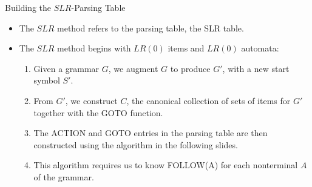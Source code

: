 \begin{bibunit}[apalike]
\begin{frame}{Building the $SLR$-Parsing Table}
	\begin{itemize}
	\item The $SLR$ method refers to the parsing table, the SLR table.
	\vfill
	\item The $SLR$ method begins with $LR(0)$ items and $LR(0)$ automata:
		\begin{enumerate}
		\item Given a grammar $G$, we augment $G$ to produce $G'$, with a new start symbol $S'$.
		\item From $G'$, we construct $C$, the canonical collection of sets of items for $G'$ together with the GOTO function.
		\item The ACTION and GOTO entries in the parsing table are then constructed using the algorithm in the following slides.
		\item This algorithm requires us to know FOLLOW(A) for each nonterminal $A$ of the grammar.
		\end{enumerate}
	\end{itemize}
\end{frame}


\end{bibunit}
